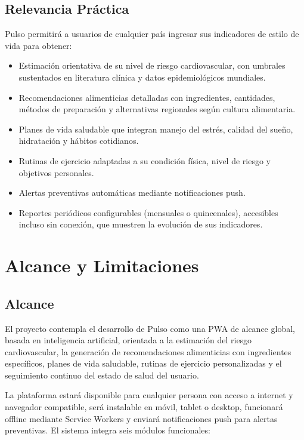 \documentclass[12pt,letterpaper]{article}
\begin{document}
\subsection{Relevancia Práctica}

Pulso permitirá a usuarios de cualquier país ingresar sus indicadores de estilo
de vida para obtener:

\begin{itemize}
  \item Estimación orientativa de su nivel de riesgo cardiovascular, con
    umbrales sustentados en literatura clínica y datos epidemiológicos
    mundiales.
  \item Recomendaciones alimenticias detalladas con ingredientes, cantidades,
    métodos de preparación y alternativas regionales según cultura alimentaria.
  \item Planes de vida saludable que integran manejo del estrés, calidad del
    sueño, hidratación y hábitos cotidianos.
  \item Rutinas de ejercicio adaptadas a su condición física, nivel de riesgo y
    objetivos personales.
  \item Alertas preventivas automáticas mediante notificaciones push.
  \item Reportes periódicos configurables (mensuales o quincenales), accesibles
    incluso sin conexión, que muestren la evolución de sus indicadores.
\end{itemize}

\newpage

\section{Alcance y Limitaciones}

\subsection{Alcance}

El proyecto contempla el desarrollo de Pulso como una PWA de alcance global,
basada en inteligencia artificial, orientada a la estimación del riesgo
cardiovascular, la generación de recomendaciones alimenticias con ingredientes
específicos, planes de vida saludable, rutinas de ejercicio personalizadas y el
seguimiento continuo del estado de salud del usuario.

La plataforma estará disponible para cualquier persona con acceso a internet y
navegador compatible, será instalable en móvil, tablet o desktop, funcionará
offline mediante Service Workers y enviará notificaciones push para alertas
preventivas. El sistema integra seis módulos funcionales:
\end{document}
